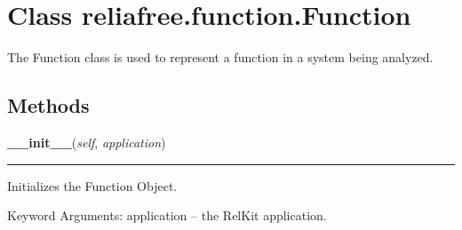 %
%
%


\section{Class reliafree.function.Function}

    \label{reliafree:function:Function}
The Function class is used to represent a function in a system being 
analyzed.



  \subsection{Methods}

    \label{reliafree:function:Function:__init__}

    \vspace{0.5ex}

\hspace{.8\funcindent}\begin{boxedminipage}{\funcwidth}

    \raggedright \textbf{\_\_init\_\_}(\textit{self}, \textit{application})

    \vspace{-1.5ex}

    \rule{\textwidth}{0.5\fboxrule}
\setlength{\parskip}{2ex}
    Initializes the Function Object.

    Keyword Arguments: application -- the RelKit application.

\setlength{\parskip}{1ex}
    \end{boxedminipage}

